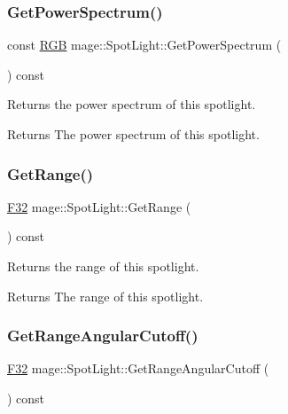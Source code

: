\subsubsection{\texorpdfstring{Get\+Power\+Spectrum()}{GetPowerSpectrum()}}
{\footnotesize\ttfamily const \hyperlink{structmage_1_1_r_g_b}{R\+GB} mage\+::\+Spot\+Light\+::\+Get\+Power\+Spectrum (\begin{DoxyParamCaption}{ }\end{DoxyParamCaption}) const\hspace{0.3cm}{\ttfamily [noexcept]}}

Returns the power spectrum of this spotlight.

\begin{DoxyReturn}{Returns}
The power spectrum of this spotlight. 
\end{DoxyReturn}
\hypertarget{classmage_1_1_spot_light_a19baba95ca8c5f5f6147ab0a03e6b64a}{}\label{classmage_1_1_spot_light_a19baba95ca8c5f5f6147ab0a03e6b64a} 
\subsubsection{\texorpdfstring{Get\+Range()}{GetRange()}}
{\footnotesize\ttfamily \hyperlink{namespacemage_aa97e833b45f06d60a0a9c4fc22ae02c0}{F32} mage\+::\+Spot\+Light\+::\+Get\+Range (\begin{DoxyParamCaption}{ }\end{DoxyParamCaption}) const\hspace{0.3cm}{\ttfamily [noexcept]}}

Returns the range of this spotlight.

\begin{DoxyReturn}{Returns}
The range of this spotlight. 
\end{DoxyReturn}
\hypertarget{classmage_1_1_spot_light_ada7b32eb18cc2bb6707a62c4ab72f4f2}{}\label{classmage_1_1_spot_light_ada7b32eb18cc2bb6707a62c4ab72f4f2} 
\subsubsection{\texorpdfstring{Get\+Range\+Angular\+Cutoff()}{GetRangeAngularCutoff()}}
{\footnotesize\ttfamily \hyperlink{namespacemage_aa97e833b45f06d60a0a9c4fc22ae02c0}{F32} mage\+::\+Spot\+Light\+::\+Get\+Range\+Angular\+Cutoff (\begin{DoxyParamCaption}{ }\end{DoxyParamCaption}) const\hspace{0.3cm}{\ttfamily [noexcept]}}

